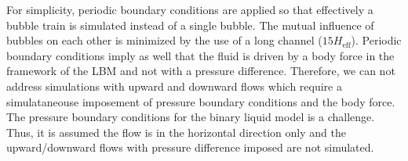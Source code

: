 \documentclass{article}
\begin{document}
For simplicity, periodic boundary conditions are applied so that effectively a bubble train is simulated
instead of a single bubble.  The mutual influence of bubbles on each other is minimized by the use
of a long
channel ($15 H_{\mathrm{eff}}$). Periodic boundary conditions imply as well that the fluid is driven
by a
body force in the framework of the LBM and not with a pressure difference. Therefore, we can not
address simulations with upward and downward flows \cite{cerro-bubble-train} which require a
simulataneouse imposement of pressure boundary conditions and the body force. The pressure boundary
conditions for the binary liquid model is a challenge. Thus, it is assumed the flow is in the
horizontal direction only and the upward/downward flows with pressure difference imposed are not
simulated. 
\begin{figure}[htb!]

\end{figure}
\end{document}
